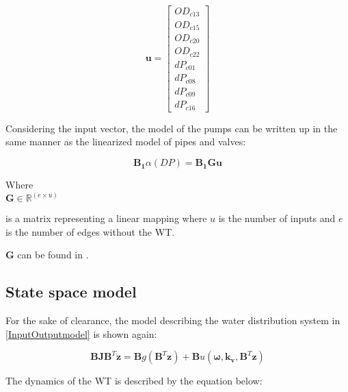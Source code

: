 \begin{equation}
\pmb{u} =
\begin{bmatrix} 
OD_{c13} \\
OD_{c15} \\
OD_{c20} \\
OD_{c22} \\
dP_{c01} \\
dP_{c08} \\
dP_{c09} \\
dP_{c16} 
\label{inputvector}
\end{bmatrix} 
\end{equation}

Considering the input vector, the model of the pumps can be written up in the same manner as the linearized model of pipes and valves: 

\begin{equation}
\pmb{B_1} \alpha(DP) = \pmb{B_1} \pmb{G} \pmb{u}
\label{gamma_lin}
\end{equation}

\begin{minipage}[t]{0.20\textwidth}
Where\\
\hspace*{8mm} $\pmb{G} \in \pmb{\mathbb{R}}^{(e \times u)} $ 
\end{minipage}
\begin{minipage}[t]{0.68\textwidth}
\vspace*{2mm}
is a matrix representing a linear mapping where $u$ is the number of inputs and $e$ is the number of edges without the WT. 
\end{minipage} 

$\pmb{G}$ can be found in .

\subsection{State space model}
 \label{SystemLin}

For the sake of clearance, the model describing the water distribution system in \eqref{InputOutputmodel} is shown again:  

\begin{equation}
 \pmb{B}\pmb{J {B}}^T \pmb{\dot{z}} = \pmb{B} g(\pmb{B}^T \pmb{z})+ \pmb{B} u(\pmb{\omega},\pmb{k_v	}, \pmb{B}^T \pmb{z})
 \label{InputOutputmodel}
\end{equation}

The dynamics of the WT is described by the equation below: 

